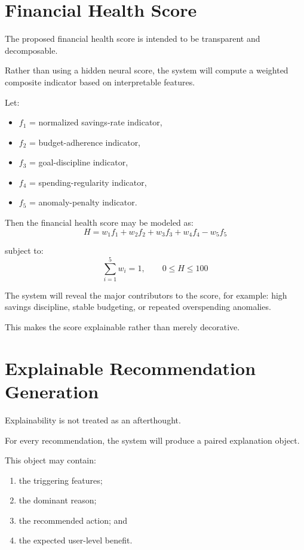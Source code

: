 \documentclass[12pt,a4paper]{report}
\begin{document}
\section{Financial Health Score}
The proposed financial health score is intended to be transparent and decomposable.

Rather than using a hidden neural score,
the system will compute a weighted composite indicator based on interpretable features.

Let:
\begin{itemize}[leftmargin=2em]
\item
$f_1$
= normalized savings-rate indicator,
\item
$f_2$
= budget-adherence indicator,
\item
$f_3$
= goal-discipline indicator,
\item
$f_4$
= spending-regularity indicator,
\item
$f_5$
= anomaly-penalty indicator.
\end{itemize}

Then the financial health score may be modeled as:
\begin{equation}
H = w_1f_1 + w_2f_2 + w_3f_3 + w_4f_4 - w_5f_5
\end{equation}

subject to:
\begin{equation}
\sum_{i=1}^{5} w_i = 1, \qquad 0 \leq H \leq 100
\end{equation}

The system will reveal the major contributors to the score,
for example:
high savings discipline,
stable budgeting,
or repeated overspending anomalies.

This makes the score explainable rather than merely decorative.

\section{Explainable Recommendation Generation}
Explainability is not treated as an afterthought.

For every recommendation,
the system will produce a paired explanation object.

This object may contain:
\begin{enumerate}[label=\arabic*.]
\item the triggering features;
\item the dominant reason;
\item the recommended action;
and
\item the expected user-level benefit.
\end{enumerate}
\end{document}

